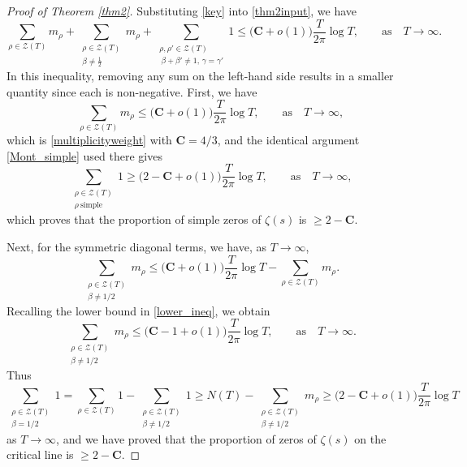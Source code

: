 \documentclass[11pt]{amsart}
\theoremstyle{remark}
\theoremstyle{plain}
\numberwithin{equation}{section}
\begin{document}
\begin{proof}[Proof of Theorem \ref{thm2}] 

Substituting \eqref{key} into \eqref{thm2input}, we have
\begin{equation} \label{thm2proofeq} 
\sum_{\rho \in \mathcal{Z}(T)}m_{\rho}+ \sum_{\substack{\rho \in \mathcal{Z}(T)\\ \beta \neq \frac{1}{2}}}m_{\rho}+ \sum_{\substack{\rho,\rho' \in \mathcal{Z}(T)\\ \ \beta+\beta' \neq 1,\, \gamma = \gamma'}} 1\le \Big(\mathbf{C}+o(1)\Big) \frac{T}{2\pi}\log{T},\qquad \text{as}
\quad T\to\infty. \end{equation}
In this inequality, removing any sum on the left-hand side results in a smaller quantity since each is non-negative.
First, we have 
\[ \sum_{\rho \in \mathcal{Z}(T)} m_\rho \leq\Big(\mathbf{C}+o(1)\Big) \frac{T}{2\pi}\log{T},
\qquad \text{as} \quad T\to\infty, \]
which is \eqref{multiplicityweight} with $\mathbf{C}= 4/3$, and the identical argument \eqref{Mont_simple} used there gives
\begin{equation} \label{thm1proof1}\sum_{\substack{\rho \in \mathcal{Z}(T) \\ \rho\ \text{simple}}}1 \ge \Big(2-\mathbf{C}+o(1)\Big)\frac{T}{2\pi}\log{T},
\qquad \text{as} \quad T\to\infty, \end{equation}
which proves that the proportion of simple zeros of $\zeta(s)$ is $\ge 2-\mathbf{C}$.

Next, for the symmetric diagonal terms, we have, as $T\to\infty$,
\[ \sum_{\substack{\rho \in \mathcal{Z}(T)\\ \beta\neq 1/2}} m_\rho \le \Big(\mathbf{C}+o(1)\Big) \frac{T}{2\pi}\log{T} -\sum_{ \rho \in \mathcal{Z}(T)} m_\rho. \]
Recalling the lower bound in \eqref{lower_ineq}, we obtain
\begin{equation} \label{thm1proof2}\sum_{\substack{\rho \in \mathcal{Z}(T)\\ \beta\neq 1/2}} m_\rho \le \Big(\mathbf{C}-1+o(1)\Big) \frac{T}{2\pi}\log{T},
\qquad \text{as} \quad T\to\infty.
\end{equation}
Thus 
\[ \sum_{\substack{\rho \in \mathcal{Z}(T)\\ \beta= 1/2}}1= \sum_{\rho \in \mathcal{Z}(T)}1 - \sum_{\substack{\rho \in \mathcal{Z}(T)\\ \beta\neq 1/2}}1 \ge N(T)-\sum_{\substack{\rho \in \mathcal{Z}(T)\\ \beta\neq 1/2}} m_\rho \ge \Big(2-\mathbf{C}+o(1)\Big) \frac{T}{2\pi}\log{T}
\] 
as $T\to\infty$,
and we have proved that the proportion of zeros of $\zeta(s)$ on the critical line is $\ge 2-\mathbf{C}$.
\end{proof}
\end{document}

